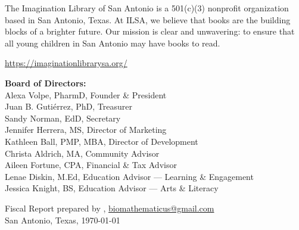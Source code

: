 {\scriptsize

\noindent
The Imagination Library of San Antonio is a 501(c)(3) nonprofit organization based in San Antonio, Texas. At ILSA, we believe that books are the building blocks of a brighter future. Our
mission is clear and unwavering: to ensure that all young children in San Antonio
may have books to read. 

\vspace{0.1in}
\noindent
\href{https://imaginationlibrarysa.org/ilsa-home/}{https://imaginationlibrarysa.org/}

\vspace{0.1in}
\noindent
\textbf{Board of Directors:} \\
Alexa Volpe, PharmD, Founder \& President \\
Juan B. Gutiérrez, PhD, Treasurer \\
Sandy Norman, EdD, Secretary \\
Jennifer Herrera, MS,  Director of Marketing\\
Kathleen Ball, PMP, MBA,  Director of Development\\
Christa Aldrich, MA, Community Advisor \\
Aileen Fortune, CPA, Financial \& Tax Advisor \\
Lenae Diskin, M.Ed, Education Advisor — Learning \& Engagement \\
Jessica Knight, BS, Education Advisor — Arts \& Literacy

\vspace{0.1in}
\noindent
Fiscal Report prepared by \href{https://biomathematicus.me/}{\TheAuthor},  \href{mailto:biomathematicus@gmail.com}{biomathematicus@gmail.com} \\
San Antonio, Texas, \today
}


\newpage



\tableofcontents

\newpage


